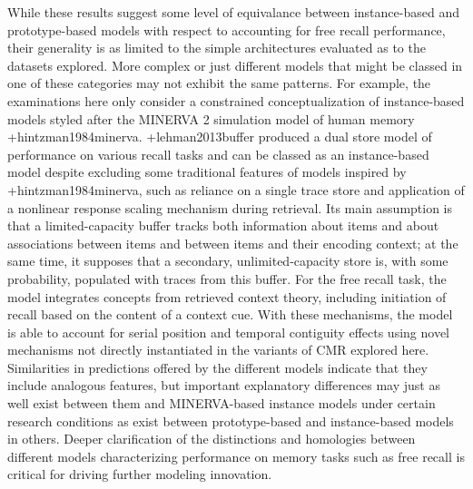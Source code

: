 {}While these results suggest some level of equivalance between instance-based and prototype-based models with respect to accounting for free recall performance, their generality is as limited to the simple architectures evaluated as to the datasets explored. More complex or just different models that might be classed in one of these categories may not exhibit the same patterns. For example, the examinations here only consider a constrained conceptualization of instance-based models styled after the MINERVA 2 simulation model of human memory +{}{}{hintzman1984minerva}. +{}{}{lehman2013buffer} produced a dual store model of performance on various recall tasks and can be classed as an instance-based model despite excluding some traditional features of models inspired by +{}{}{hintzman1984minerva}, such as reliance on a single trace store and application of a nonlinear response scaling mechanism during retrieval. Its main assumption is that a limited-capacity buffer tracks both information about items and about associations between items and between items and their encoding context; at the same time, it supposes that a secondary, unlimited-capacity store is, with some probability, populated with traces from this buffer. For the free recall task, the model integrates concepts from retrieved context theory, including initiation of recall based on the content of a context cue. With these mechanisms, the model is able to account for serial position and temporal contiguity effects using novel mechanisms not directly instantiated in the variants of CMR explored here. Similarities in predictions offered by the different models indicate that they include analogous features, but important explanatory differences may just as well exist between them and MINERVA-based instance models under certain research conditions as exist between prototype-based and instance-based models in others. Deeper clarification of the distinctions and homologies between different models characterizing performance on memory tasks such as free recall is critical for driving further modeling innovation.\relax